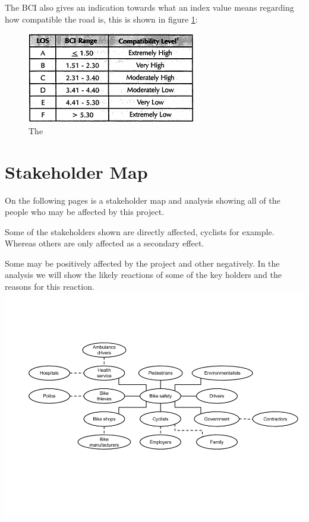 \documentclass[a4paper]{report}
\begin{document}
The BCI also gives an indication towards what an index value means regarding how compatible the road is, this is shown in figure \ref{fig:bci_los}:

\begin{figure}
\centering
\includegraphics[scale=0.7]{figures/research_report/bci_los}
\caption{The}
\label{fig:bci_los}
\end{figure}

\chapter{Stakeholder Map}
\label{ch:stakeholders}
On the following pages is a stakeholder map and analysis showing all of the people who may be affected by this project. 

Some of the stakeholders shown are directly affected, cyclists for example. Whereas others are only affected as a secondary effect.

Some may be positively affected by the project and other negatively. In the analysis we will show the likely reactions of some of the key holders and the reasons for this reaction.
\newpage
\includegraphics[scale=0.5, angle=90]{figures/stakeholder_map}
\end{document}
